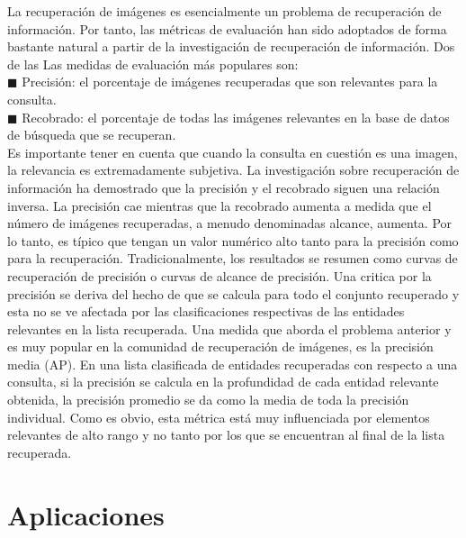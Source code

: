 \documentclass{llncs}
\begin{document}
La recuperación de imágenes es esencialmente un problema de recuperación de información. Por tanto, 
las métricas de evaluación han sido adoptados de forma bastante natural a partir de la investigación de 
recuperación de información. Dos de las Las medidas de evaluación más populares son:\\
$\blacksquare$ Precisión: el porcentaje de imágenes recuperadas que son relevantes para la consulta.\\
$\blacksquare$ Recobrado: el porcentaje de todas las imágenes relevantes en la base de datos de búsqueda que se recuperan.\\

Es importante tener en cuenta que cuando la consulta en cuestión es una imagen, la relevancia es extremadamente subjetiva. 
La investigación sobre recuperación de información ha demostrado que la precisión y el recobrado siguen una relación inversa. 
La precisión cae mientras que la recobrado aumenta a medida que el número de imágenes recuperadas, a menudo denominadas alcance, 
aumenta. Por lo tanto, es típico que tengan un valor numérico alto tanto para la precisión como para la recuperación. 
Tradicionalmente, los resultados se resumen como curvas de recuperación de precisión o curvas de alcance de precisión. 
Una critica por la precisión se deriva del hecho de que se calcula para todo el conjunto recuperado y esta no se ve afectada 
por las clasificaciones respectivas de las entidades relevantes en la lista recuperada. Una medida que aborda el problema 
anterior y es muy popular en la comunidad de recuperación de imágenes, es la precisión media (AP). En una lista clasificada 
de entidades recuperadas con respecto a una consulta, si la precisión se calcula en la profundidad de cada entidad relevante 
obtenida, la precisión promedio se da como la media de toda la precisión individual. Como es obvio, esta métrica está muy 
influenciada por elementos relevantes de alto rango y no tanto por los que se encuentran al final de la lista recuperada.


\chapter*{Aplicaciones}
\end{document}
